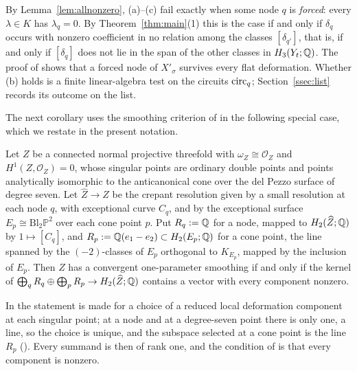 \begin{remark}\label{rem:forced}
By Lemma~\ref{lem:allnonzero}, (a)--(c) fail exactly when some node $q$ is \emph{forced}: every $\lambda\in K$ has
$\lambda_q=0$. By Theorem~\ref{thm:main}(1) this is the case if and only if $\delta_q$ occurs with nonzero coefficient in
no relation among the classes $[\delta_{q'}]$, that is, if and only if $[\delta_q]$ does not lie in the span of the other
classes in $H_3(Y_t;\mathbb Q)$. The proof of \cite[Thm.~2.5]{Nam02} shows that a forced
node of $X'_\sigma$ survives every flat deformation. Whether (b) holds is a finite linear-algebra test on the circuits
$\mathrm{circ}_q$; Section~\ref{ssec:list} records its outcome on the list.
\end{remark}

The next corollary uses the smoothing criterion of \cite{Paper5} in the following special case, which we restate in
the present notation.

\begin{theorem}\label{thm:paper5crit}
Let $Z$ be a connected normal projective threefold with $\omega_Z\cong\mathcal O_Z$ and $H^1(Z,\mathcal O_Z)=0$, whose singular
points are ordinary double points and points analytically isomorphic to the anticanonical cone over the del Pezzo
surface of degree seven. Let $\widehat Z\to Z$ be the crepant resolution given by a small resolution at each node $q$, with
exceptional curve $C_q$, and by the exceptional surface $E_p\cong\mathrm{Bl}_2\mathbb P^2$ over each cone point $p$. Put
$R_q:=\mathbb Q$ for a node, mapped to $H_2(\widehat Z;\mathbb Q)$ by $1\mapsto[C_q]$, and $R_p:=\mathbb Q(e_1-e_2)\subset H_2(E_p;\mathbb Q)$ for a cone
point, the line spanned by the $(-2)$-classes of $E_p$ orthogonal to $K_{E_p}$, mapped by the inclusion of $E_p$. Then $Z$ has a convergent
one-parameter smoothing if and only if the kernel of $\bigoplus_qR_q\oplus\bigoplus_pR_p\to H_2(\widehat Z;\mathbb Q)$ contains a vector
with every component nonzero.
\end{theorem}

In \cite{Paper5} the statement is made for a choice of a reduced local deformation component at each singular point; at a
node and at a degree-seven point there is only one, a line, so the choice is unique, and the subspace selected at a cone
point is the line $R_p$ (\cite[\S1, \S2.1]{Paper5}). Every summand is then of rank one, and the condition of
\cite[Thm.~4.7]{Paper5} is that every component is nonzero.

